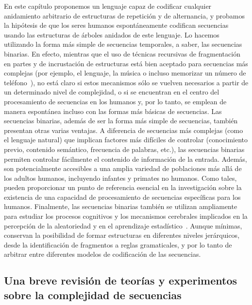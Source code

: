 En este capítulo proponemos un lenguaje capaz de codificar cualquier anidamiento arbitrario de estructuras de repetición y de alternancia, y probamos la hipótesis de que los seres humanos espontáneamente codifican secuencias usando las estructuras de árboles anidados de este lenguaje. Lo hacemos utilizando la forma más simple de secuencias temporales, a saber, las secuencias binarias. En efecto, mientras que el uso de técnicas recursivas de fragmentación en partes y de incrustación de estructuras está bien aceptado para secuencias más complejas (por ejemplo, el lenguaje, la música o incluso memorizar un número de teléfono~\cite{f16}), no está claro si estos mecanismos sólo se vuelven necesarios a partir de un determinado nivel de complejidad, o si se encuentran en el centro del procesamiento de secuencias en los humanos y, por lo tanto, se emplean de manera espontánea incluso con las formas más básicas de secuencias. Las secuencias binarias, además de ser la forma más simple de secuencias, también presentan otras varias ventajas. A diferencia de secuencias más complejas (como el lenguaje natural) que implican factores más difíciles de controlar (conocimiento previo, contenido semántico, frecuencia de palabras, etc.), las secuencias binarias permiten controlar fácilmente el contenido de información de la entrada. Además, son potencialmente accesibles a una amplia variedad de poblaciones más allá de los adultos humanos, incluyendo infantes y primates no humanos. Como tales, pueden proporcionar un punto de referencia esencial en la investigación sobre la existencia de una capacidad de procesamiento de secuencias específicas para los humanos. Finalmente, las secuencias binarias también se utilizan ampliamente para estudiar los procesos cognitivos y los mecanismos cerebrales implicados en la percepción de la aleatoriedad y en el aprendizaje estadístico~\cite{f17,f18,f19,f20,f21,f22}. Aunque mínimas, conservan la posibilidad de formar estructuras en diferentes niveles jerárquicos, desde la identificación de fragmentos a reglas gramaticales, y por lo tanto de arbitrar entre diferentes modelos de codificación de las secuencias. 

\subsection{Una breve revisión de teorías y experimentos sobre la complejidad de secuencias}


